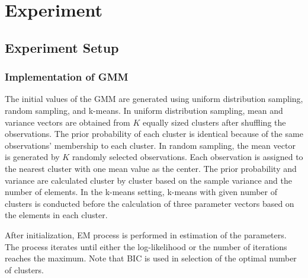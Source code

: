 \documentclass[10pt,journal,compsoc]{IEEEtran}
\begin{document}
\section{Experiment}\label{sec:experiment}

    \subsection{Experiment Setup}
    
    \subsubsection{Implementation of GMM}
    
    The initial values of the GMM are generated using uniform distribution sampling, random sampling, and k-means. In uniform distribution sampling, mean and variance vectors are obtained from $K$ equally sized clusters after shuffling the observations. The prior probability of each cluster is identical because of the same observations' membership to each cluster. In random sampling, the mean vector is generated by $K$ randomly selected observations. Each observation is assigned to the nearest cluster with one mean value as the center. The prior probability and variance are calculated cluster by cluster based on the sample variance and the number of elements. In the k-means setting, k-means with given number of clusters is conducted before the calculation of three parameter vectors based on the elements in each cluster.  
    
    After initialization, EM process is performed in estimation of the parameters. The process iterates until either the log-likelihood or the number of iterations reaches the maximum. Note that BIC is used in selection of the optimal number of clusters.
    
\end{document}
